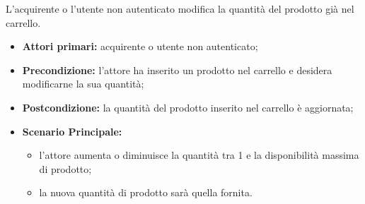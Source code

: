 



L'acquirente o l'utente non autenticato modifica la quantità del prodotto già nel carrello.
\begin{itemize}
    \item \textbf{Attori primari:} acquirente o utente non autenticato;
    \item \textbf{Precondizione:} l'attore ha inserito un prodotto nel carrello e desidera modificarne la sua quantità;
    \item \textbf{Postcondizione:} la quantità del prodotto inserito nel carrello è aggiornata;
    \item \textbf{Scenario Principale:}
        \begin{itemize}
            \item l'attore aumenta o diminuisce la quantità tra 1 e la disponibilità massima di prodotto;
            \item la nuova quantità di prodotto sarà quella fornita.
        \end{itemize}
\end{itemize}

